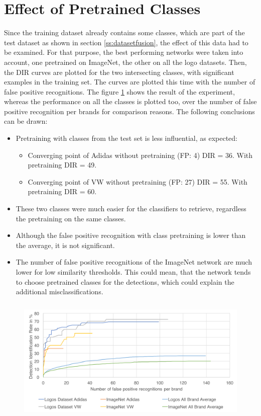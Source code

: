 \section{Effect of Pretrained Classes}
Since the training dataset already contains some classes, which are part of the test dataset as shown in section \ref{ss:datasetfusion}, the effect of this data had to be examined. For that purpose, the best performing networks were taken into account, one pretrained on ImageNet, the other on all the logo datasets. Then, the DIR curves are plotted for the two intersecting classes, with significant examples in the training set. The curves are plotted this time with the number of false positive recognitions. The figure \ref{f:commonbrandseffect} shows the result of the experiment, whereas the performance on all the classes is plotted too, over the number of false positive recognition per brands for comparison reasons. The following conclusions can be drawn:
\begin{itemize}
    \item Pretraining with classes from the test set is less influential, as expected:
    \begin{itemize}
        \item Converging point of Adidas without pretraining (FP: 4)  DIR = 36. With pretraining DIR = 49.
        \item Converging point of VW without pretraining (FP: 27)  DIR = 55. With pretraining DIR = 60.
    \end{itemize}
    \item These two classes were much easier for the classifiers to retrieve, regardless the pretraining on the same classes.
    \item Although the false positive recognition with class pretraining is lower than the average, it is not significant.
    \item The number of false positive recognitions of the ImageNet network are much lower for low similarity thresholds. This could mean, that the network tends to choose pretrained classes for the detections, which could explain the additional misclassifications.
\end{itemize}
\begin{figure}
  \centering
  \includegraphics[height=60mm]{images/mt/commonbrandseffect.png}
  \caption{}
  \label{f:commonbrandseffect}
\end{figure}

